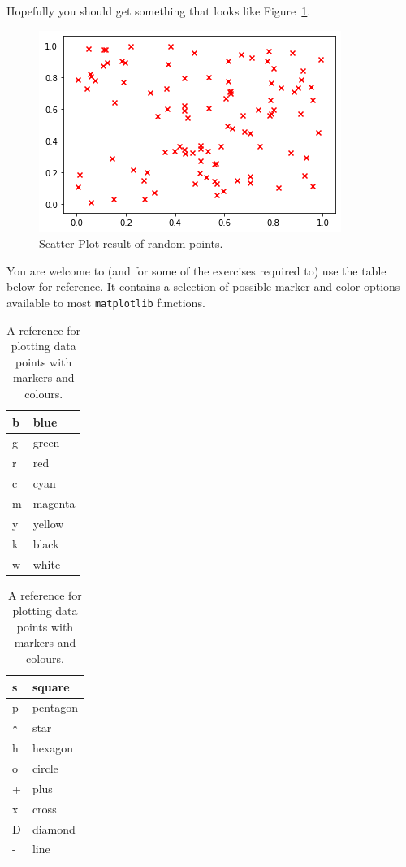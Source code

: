 Hopefully you should get something that looks like Figure~\ref{fig:random_scatter}.

\begin{figure}[H]
	\centering
	\includegraphics[scale=0.75]{Pictures/Week6_random_scatter.png}
\caption{Scatter Plot result of random points.}
\label{fig:random_scatter}
\end{figure}

You are welcome to (and for some of the exercises required to) use the table below for reference. It contains a selection of possible marker and color options available to most \texttt{matplotlib} functions.

\begin{table}[H]
\begin{center}
\begin{tabular}{|l | p{2cm}|}
\hline
b & blue\\\hline
g & green\\\hline
r & red\\\hline
c & cyan\\\hline
m & magenta\\\hline
y & yellow\\\hline
k & black\\\hline
w & white \\\hline
\end{tabular}
\hspace{4ex} 
\begin{tabular}{|l | p{3cm}|}
\hline
s & square\\\hline
p & pentagon\\\hline
\texttt{*} & star\\\hline
h & hexagon\\\hline
o & circle\\\hline
+ & plus\\\hline
x & cross\\\hline
D & diamond\\\hline
- & line\\\hline
\end{tabular}
\end{center}
\caption{A reference for plotting data points with markers and colours.}
\label{tab:plte}
\end{table}

